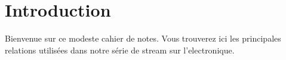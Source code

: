 \chapter{Introduction}

Bienvenue sur ce modeste cahier de notes. Vous trouverez ici les principales relations utilisées dans notre série de stream sur l'electronique.


